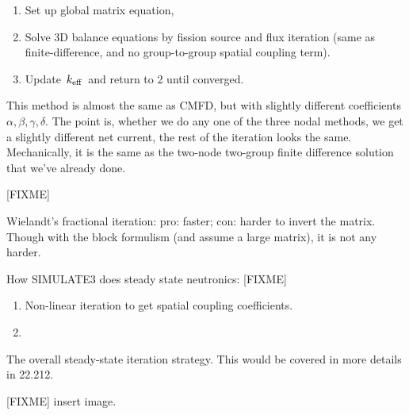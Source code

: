 \documentclass{school-22.211-notes}
\begin{document}
\begin{enumerate}
\item Set up global matrix equation,

\item Solve 3D balance equations by fission source and flux iteration (same as finite-difference, and no group-to-group spatial coupling term). 

\item Update $\left. k_{\mathrm{eff}} \right.$ and return to 2 until converged. 
\end{enumerate}
This method is almost the same as CMFD, but with slightly different coefficients $\alpha, \beta, \gamma, \delta$. The point is, whether we do any one of the three nodal methods, we get a slightly different net current, the rest of the iteration looks the same. Mechanically, it is the same as the two-node two-group finite difference solution that we've already done. 




\clearpage
{}

[FIXME]

Wielandt's fractional iteration: pro: faster; con: harder to invert the matrix. Though with the block formulism (and assume a large matrix), it is not any harder. 



\clearpage
{}
How SIMULATE3 does steady state neutronics: [FIXME]
\begin{enumerate}
\item Non-linear iteration to get spatial coupling coefficients. 
\item 
\end{enumerate}

The overall steady-state iteration strategy. This would be covered in more details in 22.212. 

[FIXME] insert image. 
\end{document}
